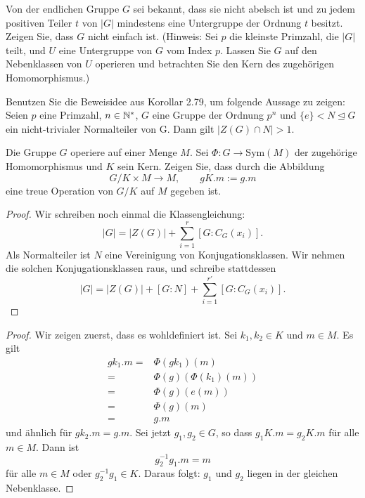 \begin{Problem}
Von der endlichen Gruppe $G$ sei bekannt, dass sie nicht abelsch ist und zu jedem positiven Teiler $t$ von $|G|$ mindestens eine Untergruppe der Ordnung $t$ besitzt. Zeigen Sie, dass $G$ nicht einfach ist. (Hinweis: Sei $p$ die kleinste Primzahl, die $|G|$ teilt, und $U$ eine Untergruppe von $G$ vom Index $p$. Lassen Sie $G$ auf den Nebenklassen von $U$ operieren und betrachten Sie den Kern des zugehörigen Homomorphismus.)	
\end{Problem}

\begin{Problem}
Benutzen Sie die Beweisidee aus Korollar 2.79, um folgende Aussage zu zeigen: Seien $p$ eine Primzahl, $n \in \mathbb{N}^*$, $G$ eine Gruppe der Ordnung $p^n$ und $\{e\} < N \trianglelefteq G$ ein nicht-trivialer Normalteiler von G. Dann gilt $|Z(G) \cap N| > 1$.	
\end{Problem}

\begin{Problem}
	Die Gruppe $G$ operiere auf einer Menge $M$. Sei $\Phi:G\to \text{Sym}(M)$ der zugehörige Homomorphismus und $K$ sein Kern. Zeigen Sie, dass durch die Abbildung
	\[
G / K \times M \to M,\qquad gK.m:=g.m
\]
eine treue Operation von $G / K$ auf $M$ gegeben ist.
\end{Problem}
\begin{proof}
	Wir schreiben noch einmal die Klassengleichung:
	\[
		|G|=|Z(G)|+\sum_{i=1}^r [G:C_G(x_i)]
	.\] 
	Als Normalteiler ist $N$ eine Vereinigung von Konjugationsklassen. Wir nehmen die solchen Konjugationsklassen raus, und schreibe stattdessen
	\[
		|G|=|Z(G)|+[G:N]+\sum_{i=1}^{r'}[G:C_G(x_i)]
	.\] 
\end{proof}
\begin{proof}
	Wir zeigen zuerst, dass es wohldefiniert ist. Sei $k_1,k_2\in K$ und $m\in M$. Es gilt
	\begin{align*}
		gk_1.m=&\Phi(gk_1)(m)\\
		=&\Phi(g)(\Phi(k_1)(m))\\
		=&\Phi(g)(e(m))\\
		=&\Phi(g)(m)\\
		=&g.m
	\end{align*}
	und ähnlich für $gk_2.m=g.m$. Sei jetzt $g_1,g_2\in G$, so dass $g_1K.m=g_2K.m$ f\"{u}r alle $m\in M$. Dann ist
	\[
		g_2^{-1}g_1.m=m
	\]
	f\"{u}r alle $m\in M$ oder $g_2^{-1}g_1\in K$. Daraus folgt: $g_1$ und $g_2$ liegen in der gleichen Nebenklasse.
\end{proof}
